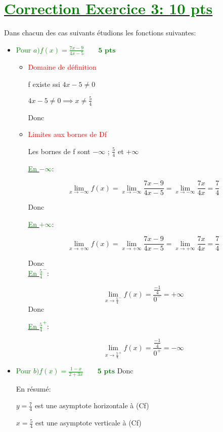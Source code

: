 \documentclass[12pt]{article}
\begin{document}
\section*{\underline{\textcolor{green}{Correction Exercice 3: \textbf{10 pts}}}}
Dans chacun des cas suivants étudions les fonctions suivantes:
\begin{itemize}
\item \textcolor{green}{Pour $a)f(x)=\frac{7x-9}{4x-5}\quad\quad\textbf{5 pts}$}
\begin{itemize}
\item \textcolor{red}{Domaine de définition}

f existe ssi $4x-5\neq 0$

$4x-5\neq 0 \implies x\neq\frac{5}{4}$

Donc \textcolor{green}{}

\item \textcolor{red}{Limites aux bornes de Df}

Les bornes de f sont $-\infty$ ; $\frac{5}{4}$ et $+\infty$

\underline{\textcolor{green}{En $-\infty $}}:

\[\lim_{x \to -\infty}f(x)=\lim_{x \to -\infty}\frac{7x-9}{4x-5}=\lim_{x \to -\infty}\frac{7x}{4x}=\frac{7}{4}\]

Donc \textcolor{green}{}

\underline{\textcolor{green}{En $+\infty $}}:

\[\lim_{x \to +\infty}f(x)=\lim_{x \to +\infty}\frac{7x-9}{4x-5}=\lim_{x \to +\infty}\frac{7x}{4x}=\frac{7}{4}\]

Donc \textcolor{green}{}\\

\underline{\textcolor{green}{En $\frac{5}{4}^{-}$}}:

\[\lim_{x \to \frac{5}{4}^{-}}f(x)=\frac{\frac{-1}{4}}{0^{-}}=+\infty\]
Donc \textcolor{green}{}

\underline{\textcolor{green}{En $\frac{5}{4}^{+}$}}:

\[\lim_{x \to \frac{5}{4}^{+}}f(x)=\frac{\frac{-1}{4}}{0^{+}}=-\infty\]
\end{itemize}
\item \textcolor{green}{Pour $b)f(x)=\frac{1-x}{2+3x}\quad\quad\textbf{5 pts}$}
Donc \textcolor{green}{}

En résumé:

$y=\frac{7}{4}$ est une asymptote horizontale à (Cf)

$x=\frac{5}{4}$ est une asymptote verticale à (Cf)
\end{itemize}
\end{document}
